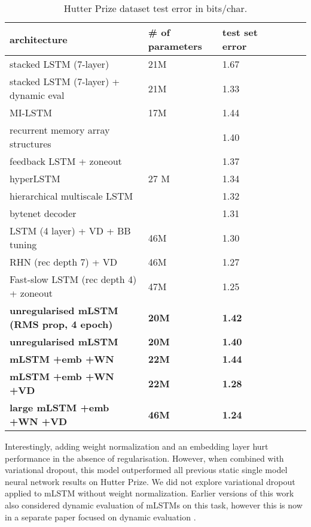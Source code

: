 \documentclass{article}
\begin{document}
\begin{table}[h]
\begin{center} 
\begin{tabular}{  l  l  l  l  l  l  l } \toprule 
architecture & \# of parameters & test set error \\ 
\midrule 
stacked LSTM (7-layer) \citep{Graves-2013} &  21M & 1.67 \\ 
stacked LSTM (7-layer) + dynamic eval \citep{Graves-2013} &  21M & 1.33 \\ 
MI-LSTM \citep{wu2016} &  17M & 1.44 \\  
recurrent memory array structures \citep{rocki2016} & & 1.40 \\
feedback LSTM + zoneout  \citep{rocki2016b} & & 1.37 \\
hyperLSTM  \citep{Ha2017} & 27 M & 1.34\\   
hierarchical multiscale LSTM \citep{chung2017} & & 1.32 \\  
bytenet decoder \citep{Kalchbrenner2016} & & 1.31\\  
LSTM (4 layer) + VD + BB tuning \citep{melis2017}& 46M & 1.30\\
RHN (rec depth 7) + VD \citep{zilly2017} & 46M & 1.27\\
Fast-slow LSTM (rec depth 4)  + zoneout \citep{mujika2017} & 47M & 1.25\\
\midrule
\textbf{unregularised mLSTM (RMS prop, 4 epoch)} & \textbf{20M} & \textbf{1.42} \\
\textbf{unregularised mLSTM} & \textbf{20M} & \textbf{1.40} \\
\textbf{mLSTM +emb +WN}  & \textbf{22M} & \textbf{1.44} \\
\textbf{mLSTM +emb +WN +VD} & \textbf{22M} & \textbf{1.28} \\
\textbf{large mLSTM +emb +WN +VD}  & \textbf{46M} & \textbf{1.24} \\
\bottomrule
\end{tabular} 
\end{center}
\caption{Hutter Prize dataset test error in bits/char.}
\label{tab:wiki-res}
\end{table}
Interestingly, adding weight normalization and an embedding layer hurt performance in the absence of regularisation. However, when combined with variational dropout, this model outperformed all previous static single model neural network results on Hutter Prize. We did not explore variational dropout applied to mLSTM without weight normalization. Earlier versions of this work also considered dynamic evaluation of mLSTMs on this task, however this is now in a separate paper focused on dynamic evaluation \citep{krause2017}.
 
\end{document}
